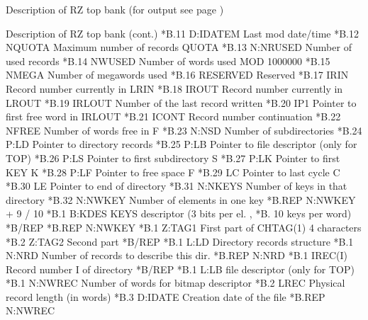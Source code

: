 \begin{landscapebody}
\begin{XMPt}{Description of RZ top bank (for output see page \pageref{xmp:rztop})}
\end{XMPt}
\NODOC{\end{minipage}}
\newpage
\NODOC{\begin{minipage}[t]{.49\hsize}}
\begin{XMPt}{Description of RZ top bank (cont.)}
*B.11    D:IDATEM      Last mod date/time                       
*B.12    NQUOTA        Maximum number of records QUOTA          
*B.13    N:NRUSED      Number of used records                   
*B.14    NWUSED        Number of words used MOD 1000000         
*B.15    NMEGA         Number of megawords used                 
*B.16    RESERVED      Reserved                        
*B.17    IRIN          Record number currently in LRIN          
*B.18    IROUT         Record number currently in LROUT         
*B.19    IRLOUT        Number of the last record written        
*B.20    IP1           Pointer to first free word in IRLOUT     
*B.21    ICONT         Record number continuation               
*B.22    NFREE         Number of words free in F                
*B.23    N:NSD         Number of subdirectories                 
*B.24    P:LD          Pointer to directory records             
*B.25    P:LB          Pointer to file descriptor (only for TOP)
*B.26    P:LS          Pointer to first subdirectory S          
*B.27    P:LK          Pointer to first KEY   K                 
*B.28    P:LF          Pointer to free space  F                 
*B.29    LC            Pointer to last cycle  C                 
*B.30    LE            Pointer to end of directory              
*B.31    N:NKEYS       Number of keys in that directory         
*B.32    N:NWKEY       Number of elements in one key 
*B.REP                 N:NWKEY + 9 / 10           
*B.1     B:KDES        KEYS descriptor (3 bits per el. ,
*B.                    10 keys per word) 
*B/REP    
*B.REP               N:NWKEY           
*B.1     Z:TAG1       First part of CHTAG(1) 4 characters      
*B.2     Z:TAG2       Second part                              
*B/REP    
*B.1     L:LD          Directory records structure
*B.1     N:NRD         Number of records to describe this dir.  
*B.REP               N:NRD           
*B.1     IREC(I)       Record number I of directory             
*B/REP
*B.1     L:LB          file descriptor (only for TOP)
*B.1     N:NWREC       Number of words for bitmap descriptor      
*B.2     LREC          Physical record length (in words)          
*B.3     D:IDATE       Creation date of the file                  
*B.REP               N:NWREC            
\end{XMPt}

\end{landscapebody}
